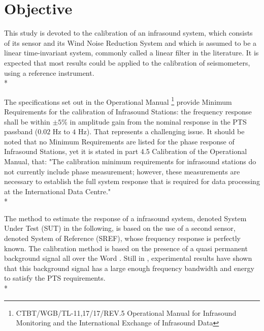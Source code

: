 \section{Objective}


This study is devoted to the calibration of an infrasound system, which consists of its sensor and its Wind Noise Reduction System and which is assumed to be a linear time-invariant system, commonly called a linear filter in the literature.  It is expected that most results could be applied to the calibration of seismometers, using a reference instrument.\\*

The specifications set out in the Operational Manual \footnote{CTBT/WGB/TL-11,17/17/REV.5 Operational Manual for Infrasound Monitoring and the International Exchange of Infrasound Data} provide Minimum Requirements for the calibration of Infrasound Stations: the frequency response shall be within $\pm 5\%$ in amplitude gain from the nominal response in the PTS passband ($0.02$ Hz to $4$ Hz). That represents a challenging issue. 
It should be noted that no Minimum Requirements are listed for the phase response of Infrasound Stations, yet it is stated in part 4.5 Calibration of the Operational Manual, that: "The calibration minimum requirements for infrasound stations do not currently include phase measurement; however, these measurements are necessary to establish the full system response that is required for data processing at the International Data Centre."\\*




The method to estimate the response of a infrasound system, denoted System Under Test (SUT) in the following, is based on the use of a second sensor, denoted System of Reference (SREF), whose frequency response is perfectly known. The calibration method is based on the presence of a quasi permanent background signal all over the Word \cite{?}.  Still in \cite{?}, experimental results have shown that this background signal has a large enough frequency bandwidth and energy to satisfy the PTS requirements. \\*


